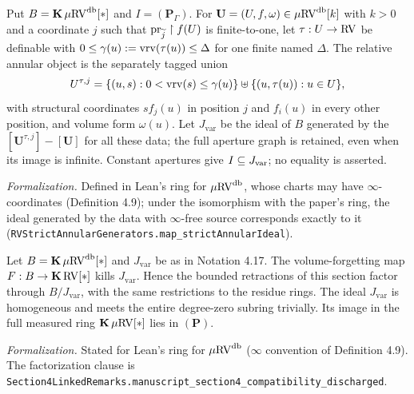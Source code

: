 \setcounter{theorem}{16}
\begin{definition}
\label{relative-annular-ideal}
\leanok
{}
Put $B = \operatorname{\mathbf{K}} \mu\mathrm{RV}^{\operatorname{db}}[*]$ and $I = (\mathbf{P}_\Gamma)$. For $\mathbf{U} = (U, f, \omega) \in \mu\mathrm{RV}^{\operatorname{db}}[k]$ with $k > 0$ and a coordinate $j$ such that $\operatorname{pr}_{\widetilde{j}} \upharpoonright f(U)$ is finite-to-one, let $\tau : U \to \mathrm{RV}$ be definable with $0 \leq \gamma(u) := \operatorname{vrv}(\tau(u)) \leq \Delta$ for one finite named $\Delta$. The relative annular object is the separately tagged union \[ U^{\tau, j} = \{(u, s) : 0 < \operatorname{vrv}(s) \leq \gamma(u)\} \uplus \{(u, \tau(u)) : u \in U\}, \] with structural coordinates $s f_j(u)$ in position $j$ and $f_i(u)$ in every other position, and volume form $\omega(u)$. Let $J_{\mathrm{var}}$ be the ideal of $B$ generated by the $[\mathbf{U}^{\tau, j}] - [\mathbf{U}]$ for all these data; the full aperture graph is retained, even when its image is infinite. Constant apertures give $I \subseteq J_{\mathrm{var}}$; no equality is asserted.

\emph{Formalization.} Defined in Lean's ring for $\mu\mathrm{RV}^{\operatorname{db}}$, whose charts may have $\infty$-coordinates (Definition 4.9); under the isomorphism with the paper's ring, the ideal generated by the data with $\infty$-free source corresponds exactly to it (\texttt{RVStrictAnnularGenerators.map\_strictAnnularIdeal}).
\end{definition}

\setcounter{theorem}{17}
\begin{lemma}
\label{relative-annular-compatibility}
\leanok
{}
Let $B = \operatorname{\mathbf{K}} \mu\mathrm{RV}^{\operatorname{db}}[*]$ and $J_{\mathrm{var}}$ be as in Notation 4.17. The volume-forgetting map $F : B \to \operatorname{\mathbf{K}} \mathrm{RV}[*]$ kills $J_{\mathrm{var}}$. Hence the bounded retractions of this section factor through $B / J_{\mathrm{var}}$, with the same restrictions to the residue rings. The ideal $J_{\mathrm{var}}$ is homogeneous and meets the entire degree-zero subring trivially. Its image in the full measured ring $\operatorname{\mathbf{K}} \mu\mathrm{RV}[*]$ lies in $(\mathbf{P})$.

\emph{Formalization.} Stated for Lean's ring for $\mu\mathrm{RV}^{\operatorname{db}}$ ($\infty$ convention of Definition 4.9). The factorization clause is \texttt{Section4LinkedRemarks.manuscript\_section4\_compatibility\_discharged}.
\end{lemma}

